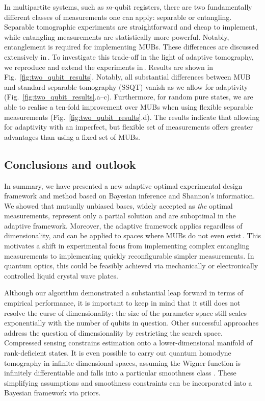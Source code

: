 In multipartite systems, such as $m$-qubit registers, there are two fundamentally different classes of measurements one can apply: separable or entangling. Separable tomographic experiments are straightforward and cheap to implement, while entangling measurements are statistically more powerful. Notably, entanglement is required for implementing MUBs. These differences are discussed extensively in\,\citep{MUBExperiment}. To investigate this trade-off in the light of adaptive tomography, we reproduce and extend the experiments in\,\citep{MUBExperiment}. Results are shown in Fig.\ \ref{fig:two_qubit_results}. Notably, all substantial differences between MUB and standard separable tomography (SSQT) vanish as we allow for adaptivity (Fig.\ \ref{fig:two_qubit_results}.a--c). Furthermore, for random pure states, we are able to realise a ten-fold improvement over MUBs when using flexible separable measurements (Fig.\ \ref{fig:two_qubit_results}.d). The results indicate that allowing for adaptivity with an imperfect, but flexible set of measurements offers greater advantages than using a fixed set of MUBs.

\subsection{Conclusions and outlook}

In summary, we have presented a new adaptive optimal experimental design framework and method based on Bayesian inference and Shannon's information. We showed that mutually unbiased bases, widely accepted as \emph{the} optimal measurements, represent only a partial solution and are suboptimal in the adaptive framework. Moreover, the adaptive framework applies regardless of dimensionality, and can be applied to spaces where MUBs do not even exist\,\citep{DimensionSix,ExactInformation}. This motivates a shift in experimental focus from implementing complex entangling measurements to implementing quickly reconfigurable simpler measurements. In quantum optics, this could be feasibly achieved via mechanically or electronically controlled liquid crystal wave plates.

Although our algorithm demonstrated a substantial leap forward in terms of empirical performance, it is important to keep in mind that it still does not resolve the curse of dimensionality: the size of the parameter space still scales exponentially with the number of qubits in question. Other successful approaches address the question of dimensionality by restricting the search space. Compressed sensing \citep{CompressedSensing} constrains estimation onto a lower-dimensional manifold of rank-deficient states. It is even possible to carry out quantum homodyne tomography in infinite dimensional spaces, assuming the Wigner function is infinitely differentiable and falls into a particular smoothness class \citep{Butucea2007}. These simplifying assumptions and smoothness constraints can be incorporated into a Bayesian framework via priors.